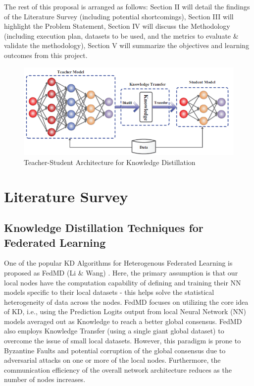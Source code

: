 \documentclass[conference]{IEEEtran}
\begin{document}
The rest of this proposal is arranged as follows: Section II will detail the findings of the Literature Survey (including potential shortcomings), Section III will highlight the Problem Statement, Section IV will discuss the Methodology (including execution plan, datasets to be used, and the metrics to evaluate \& validate the methodology), Section V will summarize the objectives and learning outcomes from this project.
\begin{figure}[htbp]
\centering
\includegraphics[scale=0.5]{Knowledge_Distillation.png}
\caption{Teacher-Student Architecture for Knowledge Distillation \cite{b3}}
\label{fig}
\end{figure}

\section{Literature Survey}
\subsection{Knowledge Distillation Techniques for Federated Learning}
One of the popular KD Algorithms for Heterogenous Federated Learning is proposed as FedMD (Li \& Wang) \cite{b4}. Here, the primary assumption is that our local nodes have the computation capability of defining and training their NN models specific to their local datasets - this helps solve the statistical heterogeneity of data across the nodes. FedMD focuses on utilizing the core idea of KD, i.e., using the Prediction Logits output from local Neural Network (NN) models averaged out as Knowledge to reach a better global consensus. FedMD also employs Knowledge Transfer (using a single giant global dataset) to overcome the issue of small local datasets. However, this paradigm is prone to Byzantine Faults and potential corruption of the global consensus due to adversarial attacks on one or more of the local nodes. Furthermore, the communication efficiency of the overall network architecture reduces as the number of nodes increases.
\end{document}
